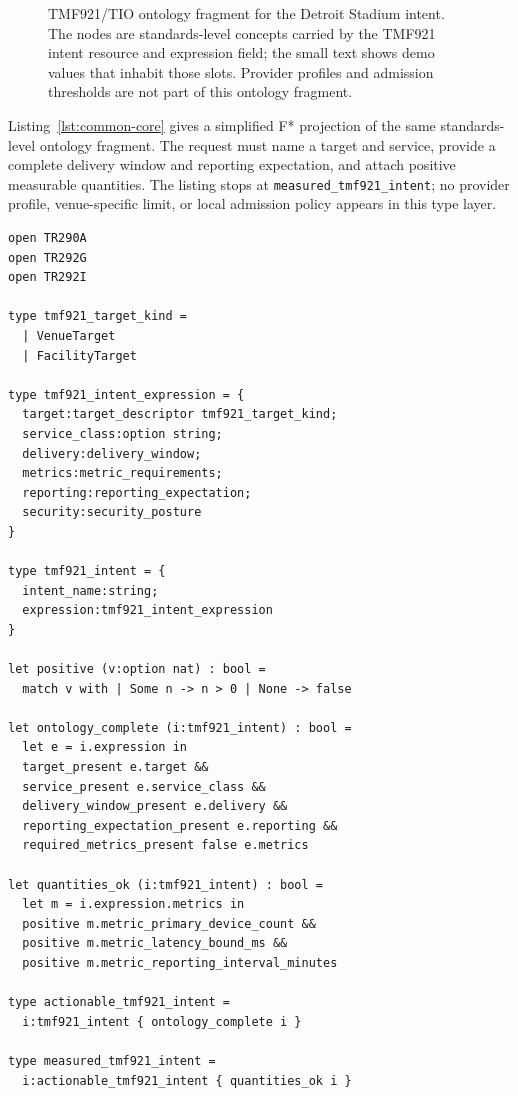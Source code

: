 \documentclass[conference]{IEEEtran}
\begin{document}
\begin{figure}[t]
{%
}
\caption{TMF921/TIO ontology fragment for the Detroit Stadium intent. The nodes are standards-level concepts carried by the TMF921 intent resource and expression field; the small text shows demo values that inhabit those slots. Provider profiles and admission thresholds are not part of this ontology fragment.}
\label{fig:ontology-fragment}
\end{figure}

Listing~\ref{lst:common-core} gives a simplified F* projection of the same standards-level ontology fragment. The request must name a target and service, provide a complete delivery window and reporting expectation, and attach positive measurable quantities. The listing stops at \texttt{measured\_tmf921\_intent}; no provider profile, venue-specific limit, or local admission policy appears in this type layer.

\begin{lstlisting}[style=fstar,caption={Simplified TMF921/TIO F* types for the ontology fragment.},label={lst:common-core}]
open TR290A
open TR292G
open TR292I

type tmf921_target_kind =
  | VenueTarget
  | FacilityTarget

type tmf921_intent_expression = {
  target:target_descriptor tmf921_target_kind;
  service_class:option string;
  delivery:delivery_window;
  metrics:metric_requirements;
  reporting:reporting_expectation;
  security:security_posture
}

type tmf921_intent = {
  intent_name:string;
  expression:tmf921_intent_expression
}

let positive (v:option nat) : bool =
  match v with | Some n -> n > 0 | None -> false

let ontology_complete (i:tmf921_intent) : bool =
  let e = i.expression in
  target_present e.target &&
  service_present e.service_class &&
  delivery_window_present e.delivery &&
  reporting_expectation_present e.reporting &&
  required_metrics_present false e.metrics

let quantities_ok (i:tmf921_intent) : bool =
  let m = i.expression.metrics in
  positive m.metric_primary_device_count &&
  positive m.metric_latency_bound_ms &&
  positive m.metric_reporting_interval_minutes

type actionable_tmf921_intent =
  i:tmf921_intent { ontology_complete i }

type measured_tmf921_intent =
  i:actionable_tmf921_intent { quantities_ok i }
\end{lstlisting}
\end{document}
